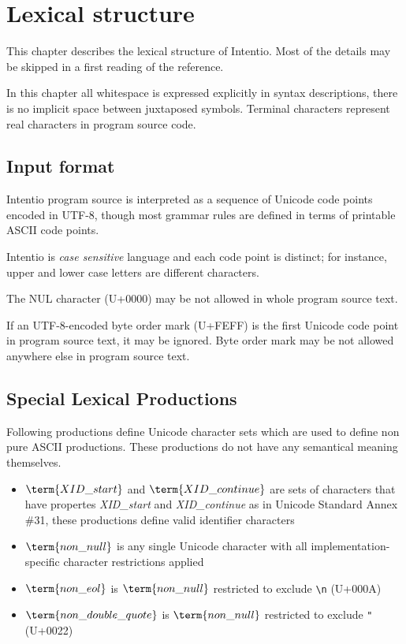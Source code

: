 \chapter{Lexical structure}

This chapter describes the lexical structure of Intentio. Most of the details may be skipped in a first reading of the reference.

In this chapter all whitespace is expressed explicitly in syntax descriptions, there is no implicit space between juxtaposed symbols. Terminal characters represent real characters in program source code.

\section{Input format}

Intentio program source is interpreted as a sequence of Unicode code points encoded in UTF-8, though most grammar rules are defined in terms of printable ASCII code points.

Intentio is \emph{case sensitive} language and each code point is distinct; for instance, upper and lower case letters are different characters.

The NUL character (U+0000) may be not allowed in whole program source text.

If an UTF-8-encoded byte order mark (U+FEFF) is the first Unicode code point in program source text, it may be ignored. Byte order mark may be not allowed anywhere else in program source text.

\section{Special Lexical Productions}

Following productions define Unicode character sets which are used to define non pure ASCII productions. These productions do not have any semantical meaning themselves.

\begin{bnfutils}
\begin{itemize}
  \item \(\term{XID\_start}\) and \(\term{XID\_continue}\) are sets of characters that have propertes \emph{XID\_start} and \emph{XID\_continue} as in Unicode Standard Annex \#31\cite{UAX31}, these productions define valid identifier characters
  \item \(\term{non\_null}\) is any single Unicode character with all implementation-specific character restrictions applied
  \item \(\term{non\_eol}\) is \(\term{non\_null}\) restricted to exclude \texttt{\textbackslash n} (U+000A)
  \item \(\term{non\_double\_quote}\) is \(\term{non\_null}\) restricted to exclude \texttt{"} (U+0022)
\end{itemize}
\end{bnfutils}

